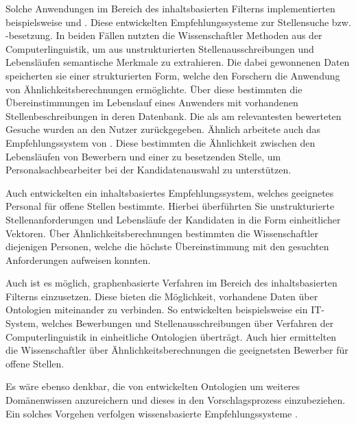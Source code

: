 Solche Anwendungen im Bereich des inhaltsbasierten Filterns implementierten beispielsweise \textcite[S. 4ff.]{guo:2016} und \textcite[S. 3ff.]{prospect:2010}. Diese entwickelten Empfehlungssysteme zur Stellensuche bzw. -besetzung. In beiden Fällen nutzten die Wissenschaftler Methoden aus der Computerlinguistik, um aus unstrukturierten Stellenausschreibungen und Lebensläufen semantische Merkmale zu extrahieren. Die dabei gewonnenen Daten speicherten sie einer strukturierten Form, welche den Forschern die Anwendung von Ähnlichkeitsberechnungen ermöglichte. Über diese bestimmten \textcite[S. 4ff.]{guo:2016} die Übereinstimmungen im Lebenslauf eines Anwenders mit vorhandenen Stellenbeschreibungen in deren Datenbank. Die als am relevantesten bewerteten Gesuche wurden an den Nutzer zurückgegeben. Ähnlich arbeitete auch das Empfehlungssystem von \textcite[S. 3ff.]{prospect:2010}. Diese bestimmten die Ähnlichkeit zwischen den Lebensläufen von Bewerbern und einer zu besetzenden Stelle, um Personalsachbearbeiter bei der Kandidatenauswahl zu unterstützen.

Auch \textcite[S. 1ff.]{almalis:2014} entwickelten ein inhaltsbasiertes Empfehlungssystem, welches geeignetes Personal für offene Stellen bestimmte. Hierbei überführten Sie unstrukturierte Stellenanforderungen und Lebensläufe der Kandidaten in die Form einheitlicher Vektoren. Über Ähnlichkeitsberechnungen bestimmten die Wissenschaftler diejenigen Personen, welche die höchste Übereinstimmung mit den gesuchten Anforderungen aufweisen konnten.

Auch ist es möglich, graphenbasierte Verfahren im Bereich des inhaltsbasierten Filterns  einzusetzen. Diese bieten die Möglichkeit, vorhandene Daten über Ontologien miteinander zu verbinden. So entwickelten beispielsweise \textcite[S. 1ff.]{kumaran:2013} ein IT-System, welches Bewerbungen und Stellenausschreibungen über Verfahren der Computerlinguistik in einheitliche Ontologien überträgt. Auch hier ermittelten die Wissenschaftler über Ähnlichkeitsberechnungen die geeignetsten Bewerber für offene Stellen.

Es wäre ebenso denkbar, die von \textcite[S. 1ff.]{kumaran:2013} entwickelten Ontologien um weiteres Domänenwissen anzureichern und dieses in den Vorschlagsprozess einzubeziehen. Ein solches Vorgehen verfolgen wissensbasierte Empfehlungssysteme \cite[S. 168f.]{recommenderSystems:2016}.%

